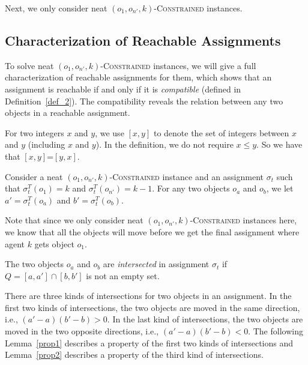 Next, we only consider neat $(o_1,o_{n'},k)$-\textsc{Constrained} instances.


\subsection{Characterization of Reachable Assignments}

To solve  neat $(o_1,o_{n'},k)$-\textsc{Constrained} instances,
we will give a full characterization of reachable assignments for them, which
shows that an assignment is reachable if and only if it is \emph{compatible} (defined in Definition~\ref{def_2}).
The compatibility reveals the relation between any two objects in a reachable assignment.


For two integers $x$ and $y$, we use $[x,y]$
to denote the set of integers between $x$ and $y$ (including $x$ and $y$). In the definition, we do not require  $x\leq y$.
So we have that $[x,y]$=$[y,x]$.


Consider a neat $(o_1,o_{n'},k)$-\textsc{Constrained} instance and an assignment $\sigma _t$ such that $\sigma^T_t(o_1)=k$ and $\sigma^T_t(o_{n'})=k-1$.
For any two objects $o_a$ and $o_b$, we let $a'=\sigma^T_t(o_a)$ and $b'=\sigma^T_t(o_b)$.

Note that since we only consider neat $(o_1,o_{n'},k)$-\textsc{Constrained} instances here, we know that all the objects will move before we get the final assignment where agent $k$ gets object $o_1$.

\begin{definition}\label{def_1}
    The two objects $o_a$ and $o_b$ are \emph{intersected} in assignment $\sigma _t$ if $Q=[a,a']\cap [b,b']$ is not an empty set.
\end{definition}


There are three kinds of intersections for two objects in an assignment. In the first two kinds of intersections, the two objects are moved in the same direction, i.e., $(a'-a)(b'-b)>0$.
In the last kind of intersections, the two objects are moved in the two opposite directions, i.e., $(a'-a)(b'-b)<0$.
The following Lemma~\ref{prop1} describes a property of the first two kinds of intersections and Lemma~\ref{prop2} describes a property of the third kind of intersections.



